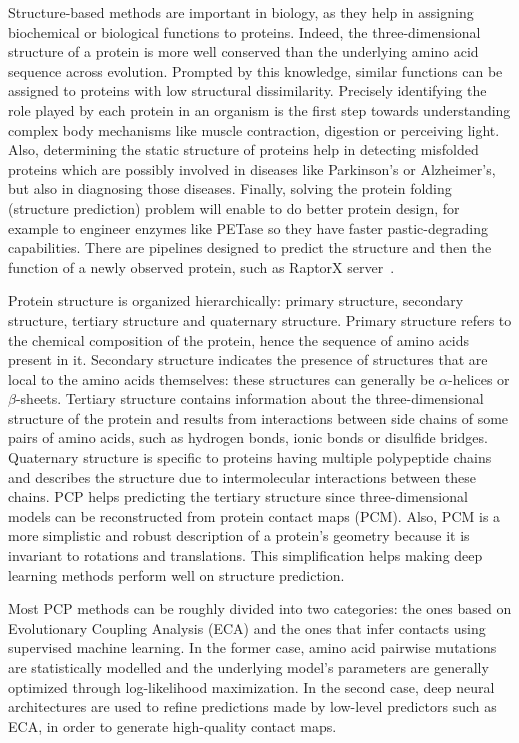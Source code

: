     Structure-based methods are important in biology, as they help in assigning biochemical or biological functions to proteins. Indeed, the three-dimensional
    structure of a protein is more well conserved than the underlying amino acid sequence across evolution. Prompted by this knowledge, similar functions
    can be assigned to proteins with low structural dissimilarity. Precisely identifying the role played by each protein in an organism is the first step
    towards understanding complex body mechanisms like muscle contraction, digestion or perceiving light.
    Also, determining the static structure of proteins help in detecting misfolded proteins which are possibly involved in diseases like Parkinson's or
    Alzheimer's, but also in diagnosing those diseases.
    Finally, solving the protein folding (structure prediction) problem will enable to do better protein design, for example to engineer enzymes like PETase
    so they have faster pastic-degrading capabilities.
    There are pipelines designed to predict the structure and then the function of a newly
    observed protein, such as RaptorX server~\cite{peng2011raptorx}.

    Protein structure is organized hierarchically: primary structure, secondary structure, tertiary structure
    and quaternary structure. Primary structure refers to the chemical composition of the protein, hence the sequence of amino acids present in it.
    Secondary structure indicates the presence of structures that are local to the amino acids themselves: these structures can generally be $\alpha$-helices
    or $\beta$-sheets. Tertiary structure contains information about the three-dimensional structure of the protein and results from interactions
    between side chains of some pairs of amino acids, such as hydrogen bonds, ionic bonds or disulfide bridges.
    Quaternary structure is specific to proteins having multiple polypeptide chains and describes the structure due to intermolecular interactions between
    these chains. PCP helps predicting the tertiary structure since three-dimensional models can be reconstructed from protein contact maps (PCM).
    Also, PCM is a more simplistic and robust description of a protein's geometry because it is invariant to rotations and translations.
    This simplification helps making deep learning methods perform well on structure prediction.

    Most PCP methods can be roughly divided into two categories:
    the ones based on Evolutionary Coupling Analysis (ECA) and the ones that infer contacts using
    supervised machine learning. In the former case, amino acid pairwise mutations are statistically modelled and the underlying model's parameters
    are generally optimized through log-likelihood maximization. In the second case, deep neural architectures are used to
    refine predictions made by low-level predictors such as ECA, in order to generate high-quality contact maps.

